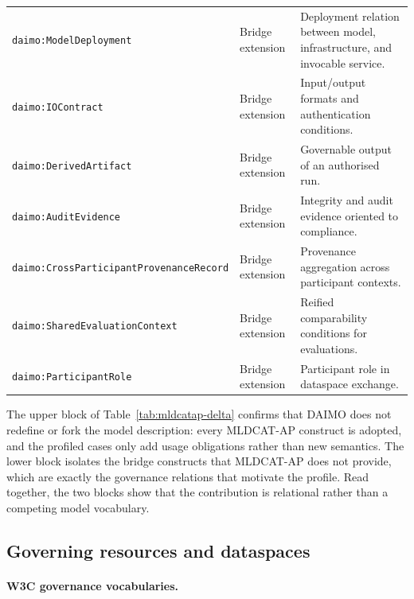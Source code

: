 \documentclass[Afour,sagev,times]{sagej}
\newcommand{\code}[1]{\texttt{#1}}
\begin{document}
\begin{table}[tb]
\begin{tabular}{@{}p{4.4cm}p{2.5cm}p{7.1cm}@{}}
\code{daimo:Model}\newline\code{Deployment} & Bridge extension & Deployment relation between model, infrastructure, and invocable service. \\
\code{daimo:IOContract} & Bridge extension & Input/output formats and authentication conditions. \\
\code{daimo:Derived}\newline\code{Artifact} & Bridge extension & Governable output of an authorised run. \\
\code{daimo:AuditEvidence} & Bridge extension & Integrity and audit evidence oriented to compliance. \\
\code{daimo:CrossParticipant}\newline\code{ProvenanceRecord} & Bridge extension & Provenance aggregation across participant contexts. \\
\code{daimo:SharedEvaluation}\newline\code{Context} & Bridge extension & Reified comparability conditions for evaluations. \\
\code{daimo:ParticipantRole} & Bridge extension & Participant role in dataspace exchange. \\
\bottomrule
\end{tabular}
\end{table}

The upper block of Table~\ref{tab:mldcatap-delta} confirms that DAIMO does not redefine or fork the model description: every MLDCAT-AP construct is adopted, and the profiled cases only add usage obligations rather than new semantics. The lower block isolates the bridge constructs that MLDCAT-AP does not provide, which are exactly the governance relations that motivate the profile. Read together, the two blocks show that the contribution is relational rather than a competing model vocabulary.

\subsection{Governing resources and dataspaces}

\paragraph{W3C governance vocabularies.}
\end{document}
